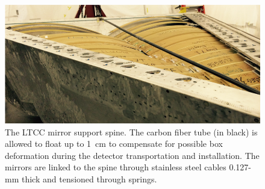 \begin{figure}
	\centering
	\includegraphics[width=1.0\columnwidth,keepaspectratio]{img/spine.png}
	\caption{The LTCC mirror support spine. The carbon fiber tube (in black) is allowed to float up to 1~cm to compensate
             for possible box deformation during the detector transportation and installation. The mirrors are linked to
             the spine through stainless steel cables 0.127-mm thick and tensioned through springs.}
	\label{fig:spine}
\end{figure}






